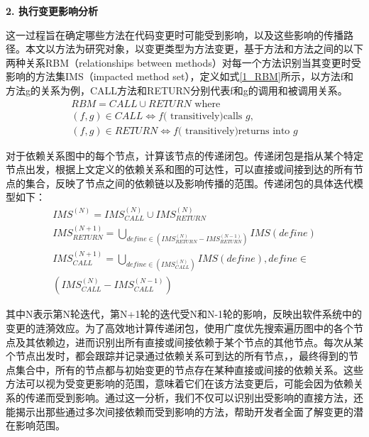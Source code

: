 \noindent \textbf{2. 执行变更影响分析}

这一过程旨在确定哪些方法在代码变更时可能受到影响，以及这些影响的传播路径。本文以方法为研究对象，以变更类型为方法变更\cite{DZBZ202104016}，基于方法和方法之间的以下两种关系RBM（relationships between methods）对每一个方法识别当其变更时受影响的方法集IMS（impacted method set），定义如式\ref{1_RBM}所示，以方法f和方法g的关系为例，CALL方法和RETURN分别代表f和g的调用和被调用关系。
\begin{equation}
\begin{array}{l}
\label{1_RBM}
R B M=C A L L \cup R E T U R N \text { where } \\
(f, g) \in C A L L \Longleftrightarrow f(\text { transitively)calls } g, \\
(f, g) \in R E T U R N \Longleftrightarrow f(\text { transitively)returns into } g
\end{array}
\end{equation}

对于依赖关系图中的每个节点，计算该节点的传递闭包。传递闭包是指从某个特定节点出发，根据上文定义的依赖关系和图的可达性，可以直接或间接到达的所有节点的集合，反映了节点之间的依赖链以及影响传播的范围。传递闭包的具体迭代模型如下：
\begin{equation}
\begin{array}{l}
\label{1_IMS}
I M S^{(N)}=I M S_{C A L L}^{(N)} \cup I M S_{R E T U R N}^{(N)} \\
I M S_{ {RETURN }}^{(N+1)}=\bigcup_{define \in (I M S_{R E T U R N}^{(N)}-I M S_{R E T U R N}^{(N-1)} ) } I M S({ define }) \\
I M S_{C A L L}^{(N+1)}=\bigcup_{ {define } \in (I M S_{C A L L}^{(N)})} I M S( { define }){, define } \in \\
\left(I M S_{C A L L}^{(N)}-I M S_{C A L L}^{(N-1)}\right) 
\end{array}
\end{equation}


其中N表示第N轮迭代，第N+1轮的迭代受N和N-1轮的影响，反映出软件系统中的变更的涟漪效应。为了高效地计算传递闭包，使用广度优先搜索遍历图中的各个节点及其依赖边，进而识别出所有直接或间接依赖于某个节点的其他节点。每次从某个节点出发时，都会跟踪并记录通过依赖关系可到达的所有节点，，最终得到的节点集合中，所有的节点都与初始变更的节点存在某种直接或间接的依赖关系。这些方法可以视为受变更影响的范围，意味着它们在该方法变更后，可能会因为依赖关系的传递而受到影响。通过这一分析，我们不仅可以识别出受影响的直接方法，还能揭示出那些通过多次间接依赖而受到影响的方法，帮助开发者全面了解变更的潜在影响范围。


